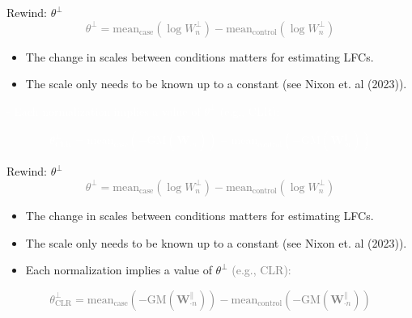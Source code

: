 \documentclass[
  ignorenonframetext,
]{beamer}
\begin{document}
\begin{frame}{Rewind: \(\theta^\perp\)}
\protect\hypertarget{rewind-thetaperp-1}{}
\textcolor{gray}{\begin{equation*}
\theta^\perp = \text{mean}_{\text{case}}(\log W_{n}^\perp) - \text{mean}_{\text{control}}(\log W_{n}^\perp)
\end{equation*}}

\vspace{.1in}

\begin{itemize}
\item
  The change in scales between conditions matters for estimating LFCs.
\item
  The scale only needs to be known up to a constant (see Nixon et. al
  (2023)).
\end{itemize}

\textcolor{white}{- Each normalization implies a value of $\theta^\perp$ \textcolor{white}{(e.g., CLR):}}

\textcolor{white}{\begin{equation*}
\theta^\perp_{\text{CLR}} = \text{mean}_{\text{case}}(-\text{GM}( \mathbf{W}_{\cdot n}^\parallel)) - \text{mean}_{\text{control}}(-\text{GM}( \mathbf{W}_{\cdot n}^\parallel)) 
\end{equation*}}
\end{frame}

\begin{frame}{Rewind: \(\theta^\perp\)}
\protect\hypertarget{rewind-thetaperp-2}{}
\textcolor{gray}{\begin{equation*}
\theta^\perp = \text{mean}_{\text{case}}(\log W_{n}^\perp) - \text{mean}_{\text{control}}(\log W_{n}^\perp)
\end{equation*}}

\vspace{.1in}

\begin{itemize}
\item
  The change in scales between conditions matters for estimating LFCs.
\item
  The scale only needs to be known up to a constant (see Nixon et. al
  (2023)).
\item
  Each normalization implies a value of \(\theta^\perp\)
  \textcolor{gray}{(e.g., CLR):}
\end{itemize}

\textcolor{gray}{\begin{equation*}
\theta^\perp_{\text{CLR}} = \text{mean}_{\text{case}}(-\text{GM}( \mathbf{W}_{\cdot n}^\parallel)) - \text{mean}_{\text{control}}(-\text{GM}( \mathbf{W}_{\cdot n}^\parallel)) 
\end{equation*}}
\end{frame}
\end{document}
